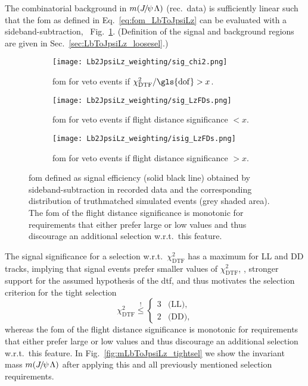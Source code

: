 The combinatorial background in $m({{J\mskip -3mu/\mskip -2mu\psi\mskip 2mu}}{\Lambda})$ (rec.\ data) is sufficiently linear such that the \gls{fom} as defined in Eq.~\eqref{eq:fom_LbToJpsiLz} can be evaluated with a sideband-subtraction, \cf{}~Fig.~\ref{fig:LbToJpsiLz_weighting_fom}.
(Definition of the signal and background regions are given in Sec.~\ref{sec:LbToJpsiLz_loosesel}.) %
\begin{figure}[htbp]
    \centering
    \begin{subfigure}{\textwidth}
        \centering 
        \texttt{[image: Lb2JpsiLz\_weighting/sig\_chi2.png]}
        \caption{\Gls{fom} for veto events if $\chi^2_\text{DTF}/\mathrm{\gls{dof}} > x$.}
    \end{subfigure}
    \par\bigskip 
    \begin{subfigure}{\textwidth}
        \centering 
        \texttt{[image: Lb2JpsiLz\_weighting/sig\_LzFDs.png]}
        \caption{\Gls{fom} for veto events if \Lz flight distance significance $< x$.}
    \end{subfigure}
    \par\bigskip
    \begin{subfigure}{\textwidth}
        \centering 
        \texttt{[image: Lb2JpsiLz\_weighting/isig\_LzFDs.png]}
        \caption{\Gls{fom} for veto events if \Lz flight distance significance $> x$.}
    \end{subfigure}
    \caption{\Gls{fom} defined as signal efficiency (solid black line) obtained by sideband-subtraction in recorded data and the corresponding distribution of \gls{truthmatched} simulated events (grey shaded area). The \gls{fom} of the \Lz flight distance significance is monotonic for requirements that either prefer large or low values and thus discourage an additional selection w.r.t.\ this feature.}
    \label{fig:LbToJpsiLz_weighting_fom}
\end{figure}
The signal significance for a selection w.r.t.\ $\chi^2_\text{DTF}$ has a maximum for \gls{LL} and \gls{DD} tracks, implying that signal events prefer smaller values of $\chi^2_\text{DTF}$, \ie{}, stronger support for the assumed hypothesis of the \gls{dtf}, and thus motivates the selection criterion for the tight selection
\begin{equation}
    \label{eq:LbToJpsiLz_tightsel}
    \chi^2_\text{DTF} \overset{!}{\le}
    \begin{cases}
        3 & \text{(LL)}, \\
        2 & \text{(DD)},
    \end{cases}
\end{equation}
whereas the \gls{fom} of the \Lz flight distance significance is monotonic for requirements that either prefer large or low values and thus discourage an additional selection w.r.t.\ this feature.
In Fig.~\ref{fig:mLbToJpsiLz_tightsel} we show the invariant mass $m({{J\mskip -3mu/\mskip -2mu\psi\mskip 2mu}}{\Lambda})$ after applying this and all previously mentioned selection requirements.

